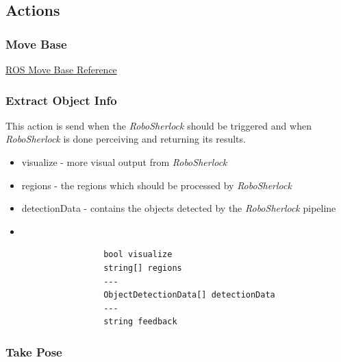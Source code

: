 \documentclass[main.tex]{subfiles}
\begin{document}
				\subsection{Actions}
				\label{actions}
					\subsubsection{Move Base}
					\label{msg_move_base}
						\href{http://wiki.ros.org/move_base_msgs/MoveBaseAction}{ROS Move Base Reference}
					\subsubsection{Extract Object Info}
					\label{msg_extract_object_info}
						This action is send when the \textit{RoboSherlock} should be triggered and when \textit{RoboSherlock} is done perceiving and returning its results.
					\begin{itemize}
						\item visualize - more visual output from \textit{RoboSherlock}
						\item regions - the regions which should be processed by \textit{RoboSherlock}
						\item detectionData - contains the objects detected by the \textit{RoboSherlock} pipeline
						\item
					\end{itemize}
					\begin{lstlisting}
					bool visualize
					string[] regions
					---
					ObjectDetectionData[] detectionData
					---
					string feedback
					\end{lstlisting}
					\subsubsection{Take Pose}
					\label{msg_take_pose}
\end{document}
